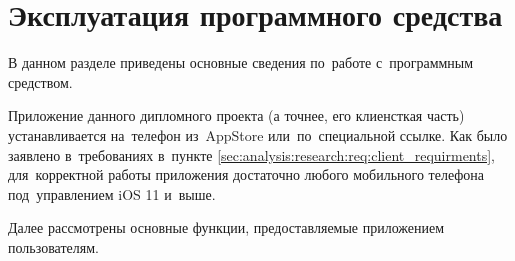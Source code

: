 \section{Эксплуатация программного средства}
\label{sec:usage}

В данном разделе приведены основные сведения по~работе с~программным средством.

Приложение данного дипломного проекта (а точнее, его клиенсткая часть) устанавливается на~телефон из~AppStore или~по~специальной ссылке. Как было заявлено в~требованиях в~пункте \ref{sec:analysis:research:req:client_requirments}, для~корректной работы приложения достаточно любого мобильного телефона под~управлением iOS 11 и~выше.

Далее рассмотрены основные функции, предоставляемые приложением пользователям.